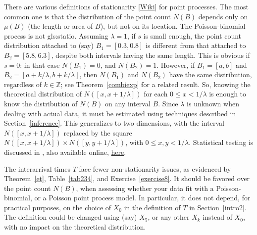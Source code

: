 \documentclass[10pt]{article}
\begin{document}
There are various definitions of \textcolor{index}{stationarity} [\href{https://mathworld.wolfram.com/StationaryPointProcess.html}{Wiki}] for point processes.  The most common one is that the distribution of the point count $N(B)$ depends only on $\mu(B)$ (the length or area of $B$), but not on its location. The Poisson-binomial process is not \gls{gls:statio}. Assuming $\lambda=1$, if $s$ is small enough, the point count distribution attached to (say) $B_1=[0.3, 0.8]$ is different from that attached to $B_2=[5.8, 6.3]$, despite both intervals having the same length. This is obvious if $s=0$: in that case $N(B_1)=0$, and $N(B_2)=1$.  However, if $B_1=[a, b]$ and 
$B_2=[a+k/\lambda,b+k/\lambda]$, then $N(B_1)$ and $N(B_2)$ have the same distribution, regardless of $k\in\mathbb{Z}$; see Theorem~\ref{combiexp} for a related result. So, knowing the theoretical distribution of $N([x,x+1/\lambda])$ for each $0\leq x<1/\lambda$ 
is enough to know the distribution of $N(B)$ on any interval $B$. Since $\lambda$ is unknown when dealing with actual data, it must be estimated using techniques described in Section~\ref{inference}. This generalizes to two dimensions, with the interval $N([x,x+1/\lambda])$ replaced by the square $N([x,x+1/\lambda]) \times N([y,y+1/\lambda])$, with $0\leq x,y<1/\lambda$. Statistical testing is discussed in \cite{sss}, also available online, \href{http://eio.usc.es/pub/metma/descargas/comas-mateu-calduch-metmav.pdf}{here}.

The interarrival times $T$ face fewer non-stationarity issues, as evidenced by Theorem~\ref{et}, Table~\ref{tab234}, and Exercise~\ref{exercise8}. It should be favored over the point count $N(B)$, when assessing whether your data fit with a Poisson-binomial, or a Poisson point process model. In particular, it does not depend, for practical purposes, on the choice of $X_0$ in the definition of $T$ in Section~\ref{intro2}. The definition could be changed using (say) $X_5$, or any other $X_k$ instead of $X_0$, with no impact on the theoretical distribution.
\end{document}
